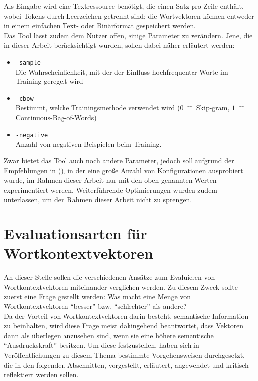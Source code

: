   Als Eingabe wird eine Textressource benötigt, die einen Satz pro Zeile enthält, wobei Tokens durch Leerzeichen getrennt sind;
  die Wortvektoren können entweder in einem einfachen Text- oder Binärformat gespeichert werden.\\
  Das Tool lässt zudem dem Nutzer offen, einige Parameter zu verändern. Jene, die in dieser Arbeit berücksichtigt wurden, sollen
  dabei näher erläutert werden:
  \begin{itemize}
    \item \verb|-sample|\\Die Wahrscheinlichkeit, mit der der Einfluss hochfrequenter Worte im Training geregelt wird
    \item \verb|-cbow|\\Bestimmt, welche Trainingsmethode verwendet wird ($0\ \hat{=}$ Skip-gram, $1\ \hat{=}$ Continuous-Bag-of-Words)
    \item \verb|-negative|\\Anzahl von negativen Beispielen beim Training.
  \end{itemize}

  Zwar bietet das Tool auch noch andere Parameter, jedoch soll aufgrund der Empfehlungen in (\citeauthor{levy2015improving}), in
  der eine große Anzahl von Konfigurationen ausprobiert wurde, im Rahmen dieser Arbeit nur mit den oben genannten Werten experimentiert werden.
  Weiterführende Optimierungen wurden zudem unterlassen, um den Rahmen dieser Arbeit nicht zu sprengen.


\section{Evaluationsarten für Wortkontextvektoren}\label{sec:we-eval}

An dieser Stelle sollen die verschiedenen Ansätze zum Evaluieren von Wortkontextvektoren miteinander verglichen werden. Zu diesem Zweck sollte zuerst eine Frage gestellt werden:
Was macht eine Menge von Wortkontextvektoren ``besser'' bzw. ``schlechter'' als andere?\\
Da der Vorteil von Wortkontextvektoren darin besteht, semantische Information zu beinhalten, wird diese
Frage meist dahingehend beantwortet, dass Vektoren dann als überlegen anzusehen sind, wenn sie
eine höhere semantische ``Ausdruckskraft'' besitzen. Um diese festzustellen, haben sich in Veröffentlichungen
zu diesem Thema bestimmte Vorgehensweisen durchgesetzt, die in den folgenden Abschnitten, vorgestellt, erläutert,
angewendet und kritisch reflektiert werden sollen.\\

